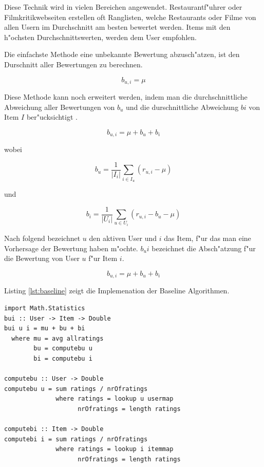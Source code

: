 \documentclass[a4paper, 12pt]{article}
\begin{document}
Diese Technik wird in vielen Bereichen angewendet. Restaurantf"uhrer oder Filmkritikwebseiten erstellen oft Ranglisten, welche Restaurants oder Filme von allen Usern im Durchschnitt am besten bewertet werden. Items mit den h"ochsten Durchschnittswerten, werden dem User empfohlen.

Die einfachste Methode eine unbekannte Bewertung abzusch"atzen, ist den Durschnitt aller Bewertungen zu berechnen.

\begin{equation}
  \label{eq:avg}
  b_{u,i} = \mu
\end{equation}

Diese Methode kann noch erweitert werden, indem man die durchschnittliche Abweichung aller Bewertungen von $b_u$ und die durschnittliche Abweichung $bi$ von Item $I$ ber"ucksichtigt \cite{jannach11}.

\begin{equation}
  \label{eq:bui}
  b_{u,i} = \mu + b_u + b_i
\end{equation}

wobei

\begin{equation}
  b_u = \frac{1}{|I_i|}\sum_{i \in I_u}(r_{u,i} - \mu)
\end{equation}

und 

\begin{equation}
  \label{eq:bi}
  b_i = \frac{1}{|U_i|}\sum_{u \in U_i}(r_{u,i} - b_u - \mu)
\end{equation}

Nach folgend bezeichnet $u$ den aktiven User und $i$ das Item, f"ur das man eine Vorhersage der Bewertung haben m"ochte. $b_ui$ bezeichnet die Absch"atzung f"ur die Bewertung von User $u$ f"ur Item $i$.

\begin{equation}
  \label{eq:baseline}
  b_{u,i} = \mu + b_u + b_i
\end{equation}

Listing \ref{lst:baseline} zeigt die Implemenation der Baseline Algorithmen.

\begin{lstlisting}[caption=Baseline predictor, label=lst:baseline]
import Math.Statistics
bui :: User -> Item -> Double
bui u i = mu + bu + bi
  where mu = avg allratings
        bu = computebu u
        bi = computebu i

computebu :: User -> Double
computebu u = sum ratings / nrOfratings
              where ratings = lookup u usermap
                    nrOfratings = length ratings

computebi :: Item -> Double
computebi i = sum ratings / nrOfratings
              where ratings = lookup i itemmap
                    nrOfratings = length ratings
\end{lstlisting}
\end{document}
